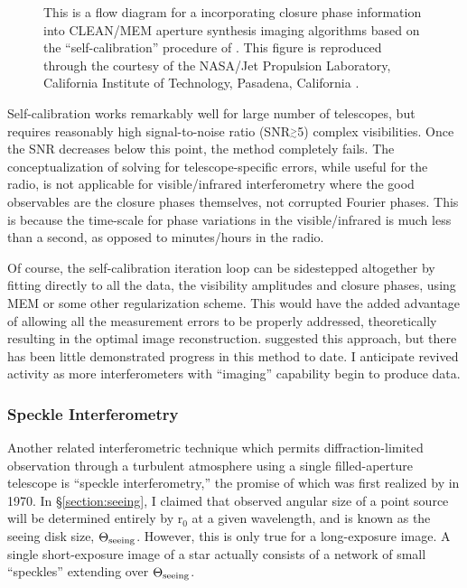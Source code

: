 \documentclass[12pt]{iopart}
\newcommand{\simge}{\mbox{$\stackrel{>}{_{\sim}}$}}
\begin{document}
\begin{figure}
\begin{center}
\caption{This is a flow diagram for a incorporating closure phase
information into CLEAN/MEM aperture synthesis imaging algorithms
based on the ``self-calibration'' procedure of \cite{cw81}. 
This figure is reproduced through the courtesy
of the NASA/Jet Propulsion Laboratory,
California Institute of Technology, Pasadena, California \citep{monnier_mss}.
\label{monnier_selfcal}}
\end{center}
\end{figure}

Self-calibration works remarkably well for large number of telescopes,
but requires reasonably high signal-to-noise ratio (SNR$\simge$5)
complex visibilities.  Once the SNR decreases below this point, the
method completely fails.  The conceptualization of solving for
telescope-specific errors, while useful for the
radio, is not applicable for visible/infrared interferometry where the good
observables are the closure phases themselves, not corrupted Fourier
phases.  This is because the time-scale for phase variations in the
visible/infrared is much less than a second, as opposed to
minutes/hours in the radio.

Of course, the self-calibration iteration loop can be sidestepped
altogether by fitting directly to all the data, the visibility
amplitudes and closure phases, using MEM or some other regularization
scheme.  This would have the added advantage of allowing all the
measurement errors to be properly addressed, theoretically resulting
in the optimal image reconstruction.  \citet{buscher1994} suggested
this approach, but there has been little demonstrated progress in this
method to date.  I anticipate revived activity as more
interferometers with ``imaging'' capability begin to produce data.


\subsubsection{Speckle Interferometry}
\label{section:speckle}

Another related interferometric technique which permits
diffraction-limited observation through a turbulent atmosphere using a
single filled-aperture telescope is ``speckle interferometry,'' the
promise of which was first realized by \citet{labeyrie70} in 1970.  In
\S\ref{section:seeing}, I claimed that observed angular size of a
point source will be determined entirely by r$_0$ at a given
wavelength, and is known as the seeing disk size, $\Theta_{\rm
  seeing}$.  However, this is only true for a long-exposure image.  A
single short-exposure image of a star actually consists of a network of
small ``speckles'' extending over $\Theta_{\rm seeing}$.
\end{document}
